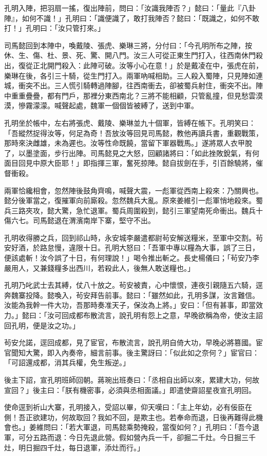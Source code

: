 孔明入陣，把羽扇一搖，復出陣前，問曰：「汝識我陣否？」懿曰：「量此『八卦陣』，如何不識！」孔明曰：「識便識了，敢打我陣否？懿曰：「既識之，如何不敢打！」孔明曰：「汝只管打來。」

司馬懿回到本陣中，喚戴陵、張虎、樂琳三將，分付曰：「今孔明所布之陣，按休、生、傷、杜、景、死、驚、開八門。汝三人可從正東生門打入，往西南休門殺出，復從正北開門殺入：此陣可破。汝等小心在意！」於是戴凌在中，張虎在前，樂琳在後，各引三十騎，從生門打入。兩軍吶喊相助。三人殺入蜀陣，只見陣如連城，衝突不出。三人慌引騎轉過陣腳，往西南衝去，卻被蜀兵射住，衝突不出。陣中重重疊疊，都有門戶，那裡分東西南北？三將不能相顧，只管亂撞，但見愁雲漠漠，慘霧濛濛。喊聲起處，魏軍一個個皆被縛了，送到中軍。

孔明坐於帳中，左右將張虎、戴陵、樂琳並九十個軍，皆縛在帳下。孔明笑曰：「吾縱然捉得汝等，何足為奇！吾放汝等回見司馬懿，教他再讀兵書，重觀戰策，那時來決雌雄，未為遲也。汝等性命既饒，當留下軍器戰馬。」遂將眾人衣甲脫了，以墨塗面，步行出陣。司馬懿見之大怒，回顧諸將曰：「如此挫敗銳氣，有何面目回見中原大臣耶！」即指揮三軍，奮死掠陣。懿自拔劍在手，引百餘驍將，催督衝殺。

兩軍恰纔相會，忽然陣後鼓角齊鳴，喊聲大震，一彪軍從西南上殺來：乃關興也。懿分後軍當之，復摧軍向前廝殺。忽然魏兵大亂。原來姜維引一彪軍悄地殺來。蜀兵三路夾攻，懿大驚，急忙退軍。蜀兵周圍殺到，懿引三軍望南死命衝出。魏兵十傷六七。司馬懿退在渭濱南岸下寨，堅守不出。

孔明收得勝之兵，回到祁山時，永安城李嚴遣都尉茍安解送糧米，至軍中交割。茍安好酒，於路怠慢，違限十日。孔明大怒曰：「吾軍中專以糧為大事，誤了三日，便該處斬！汝今誤了十日，有何理說！」喝令推出斬之。長史楊儀曰；「茍安乃李嚴用人，又兼錢糧多出西川，若殺此人，後無人敢送糧也。」

孔明乃叱武士去其縛，仗八十放之。茍安被責，心中懷恨，連夜引親隨五六騎，逕奔魏寨投降。懿喚入，茍安拜告前事。懿曰：「雖然如此，孔明多謀，汝言難信。汝能為我幹一件大功，吾那時奏准天子，保汝為上將。」安曰：「但有甚事，即當效力。」懿曰：「汝可回成都布散流言，說孔明有怨上之意，早晚欲稱為帝，使汝主詔回孔明，便是汝之功。」

茍安允諾，逕回成都，見了宦官，布散流言，說孔明自倚大功，早晚必將篡國。宦官聞知大驚，即入內奏帝，細言前事。後主驚訝曰：「似此如之奈何？」宦官曰：「可詔還成都，消其兵權，免生叛逆。」

後主下詔，宣孔明班師回朝。蔣琬出班奏曰：「丞相自出師以來，累建大功，何故宣回？」後主曰：「朕有機密事，必須與丞相面議。」即遣使齋詔星夜宣孔明回。

使命逕到祈山大寨，孔明接入，受詔以畢，仰天嘆曰：「主上年幼，必有佞臣在側！吾正欲建功，何故取回？我如不回，是欺主也。若奉命而退，日後再難得此機會也。」姜維問曰：「若大軍退，司馬懿乘勢掩殺，當復如何？」孔明曰：「吾今退軍，可分五路而退：今日先退此營。假如營內兵一千，卻掘二千灶。今日掘三千灶，明日掘四千灶，每日退軍，添灶而行。」


